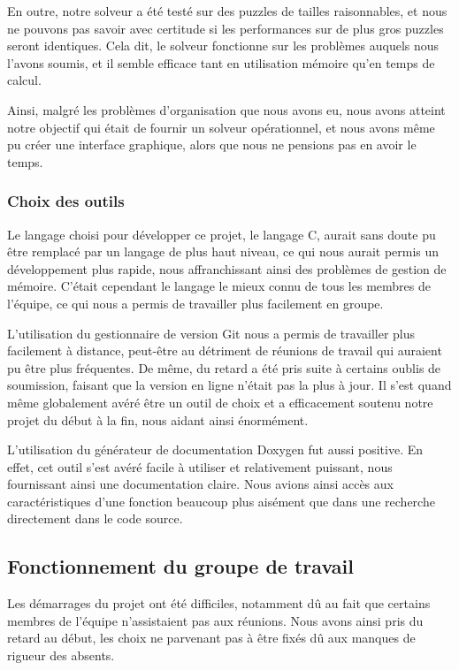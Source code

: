 En outre, notre solveur a été testé sur des puzzles de tailles raisonnables, et nous ne pouvons pas savoir avec certitude si les performances sur de plus gros puzzles seront identiques.
Cela dit, le solveur fonctionne sur les problèmes auquels nous l'avons soumis, et il semble efficace tant en utilisation mémoire qu'en temps de calcul.

Ainsi, malgré les problèmes d'organisation que nous avons eu, nous avons atteint notre objectif qui était de fournir un solveur opérationnel, et nous avons même pu créer une interface graphique, alors que nous ne pensions pas en avoir le temps.

\subsubsection{Choix des outils}

Le langage choisi pour développer ce projet, le langage C, aurait sans doute pu être remplacé par un langage de plus haut niveau, ce qui nous aurait permis un développement plus rapide, nous affranchissant ainsi des problèmes de gestion de mémoire. C'était cependant le langage le mieux connu de tous les membres de l'équipe, ce qui nous a permis de travailler plus facilement en groupe.

L'utilisation du gestionnaire de version Git nous a permis de travailler plus facilement à distance, peut-être au détriment de réunions de travail qui auraient pu être plus fréquentes. De même, du retard a été pris suite à certains oublis de soumission, faisant que la version en ligne n'était pas la plus à jour. Il s'est quand même globalement avéré être un outil de choix et a efficacement soutenu notre projet du début à la fin, nous aidant ainsi énormément.

L'utilisation du générateur de documentation Doxygen fut aussi positive. En effet, cet outil s'est avéré facile à utiliser et relativement puissant, nous fournissant ainsi une documentation claire. Nous avions ainsi accès aux caractéristiques d'une fonction beaucoup plus aisément que dans une recherche directement dans le code source.
 
   \subsection{Fonctionnement du groupe de travail} 
 
Les démarrages du projet ont été difficiles, notamment dû au fait que certains membres de l'équipe n'assistaient pas aux réunions. Nous avons ainsi pris du retard au début, les choix ne parvenant pas à être fixés dû aux manques de rigueur des absents.


